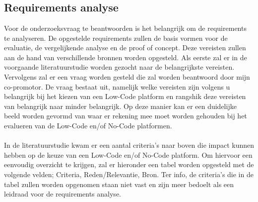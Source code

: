 
\chapter{}%
\label{ch:methodologie}


\section*{Requirements analyse}
\label{sec:requirements-analyse}
Voor de onderzoeksvraag te beantwoorden is het belangrijk om de requirements te analyseren. De opgestelde requirements zullen de basis vormen voor 
de evaluatie, de vergelijkende analyse en de proof of concept. Deze vereisten zullen aan de hand van verschillende bronnen worden opgesteld. Als eerste zal 
er in de voorgaande literatuurstudie worden gezocht naar de belangrijkste vereisten. Vervolgens zal er een vraag worden gesteld die zal worden 
beantwoord door mijn co-promotor. De vraag bestaat uit, namelijk welke vereisten zijn volgens u belangrijk bij het kiezen van een Low-Code platform en rangshik deze vereisten van belangrijk naar minder belangrijk. Op deze
manier kan er een duidelijke beeld worden gevormd van waar er rekening mee moet worden gehouden bij het evalueren van de Low-Code en/of No-Code platformen.
\\
\\
In de literatuurstudie kwam er een aantal criteria's naar boven die impact kunnen hebben op de keuze van een Low-Code en/of No-Code platform.
Om hiervoor een eenvoudig overzicht te krijgen, zal er hieronder een tabel worden opgesteld met de volgende velden; Criteria, Reden/Relevantie, Bron. 
Ter info, de criteria's die in de tabel zullen worden opgenomen staan niet vast en zijn meer bedoelt als een leidraad voor de requirements analyse.
\\
\\


